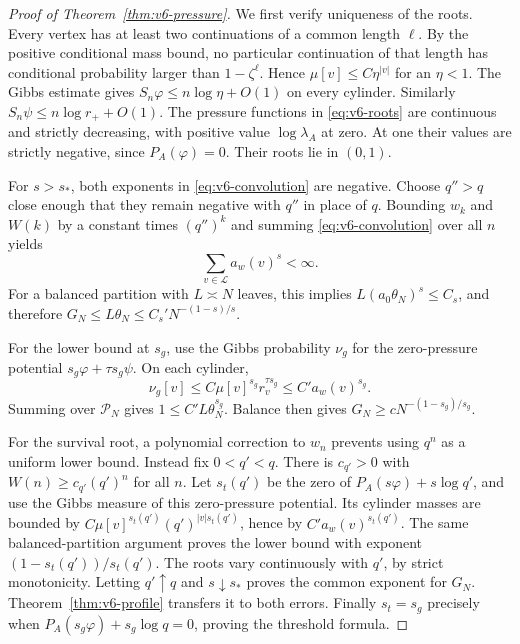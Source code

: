 \begin{proof}[Proof of Theorem~\ref{thm:v6-pressure}]
We first verify uniqueness of the roots. Every vertex has at least two
continuations of a common length $\ell$. By the positive conditional
mass bound, no particular continuation of that length has conditional
probability larger than $1-\zeta^\ell$. Hence
$\mu[v]\le C\eta^{|v|}$ for an $\eta<1$. The Gibbs estimate gives
$S_n\varphi\le n\log\eta+O(1)$ on every cylinder. Similarly
$S_n\psi\le n\log r_++O(1)$. The pressure functions in
\eqref{eq:v6-roots} are continuous and strictly decreasing, with
positive value $\log\lambda_A$ at zero. At one their values are
strictly negative, since $P_A(\varphi)=0$. Their roots lie in $(0,1)$.

For $s>s_*$, both exponents in \eqref{eq:v6-convolution} are negative.
Choose $q''>q$ close enough that they remain negative with $q''$ in
place of $q$. Bounding $w_k$ and $W(k)$ by a constant times $(q'')^k$
and summing \eqref{eq:v6-convolution} over all $n$ yields
\begin{equation}
                  \sum_{v\in\mathcal L}a_w(v)^s<\infty. \label{eq:v6-summability}
\end{equation}
For a balanced partition with $L\asymp N$ leaves, this implies
$L(a_0\theta_N)^s\le C_s$, and therefore
$G_N\le L\theta_N\le C_s'N^{-(1-s)/s}$.

For the lower bound at $s_g$, use the Gibbs probability $\nu_g$ for
the zero-pressure potential $s_g\varphi+\tau s_g\psi$. On each cylinder,
\[
 \nu_g[v]\le C\mu[v]^{s_g}r_v^{\tau s_g}\le C' a_w(v)^{s_g}.
\]
Summing over $\mathcal P_N$ gives $1\le C'L\theta_N^{s_g}$.
Balance then gives $G_N\ge cN^{-(1-s_g)/s_g}$.

For the survival root, a polynomial correction to $w_n$ prevents
using $q^n$ as a uniform lower bound. Instead fix $0<q'<q$. There
is $c_{q'}>0$ with $W(n)\ge c_{q'}(q')^n$ for all $n$.
Let $s_t(q')$ be the zero of $P_A(s\varphi)+s\log q'$, and use the
Gibbs measure of this zero-pressure potential. Its cylinder masses
are bounded by $C\mu[v]^{s_t(q')}(q')^{|v|s_t(q')}$, hence by
$C'a_w(v)^{s_t(q')}$. The same balanced-partition argument proves
the lower bound with exponent $(1-s_t(q'))/s_t(q')$.
The roots vary continuously with $q'$, by strict monotonicity.
Letting $q'\uparrow q$ and $s\downarrow s_*$ proves the common exponent
for $G_N$. Theorem~\ref{thm:v6-profile} transfers it to both errors.
Finally $s_t=s_g$ precisely when
$P_A(s_g\varphi)+s_g\log q=0$, proving the threshold formula.
\end{proof}

